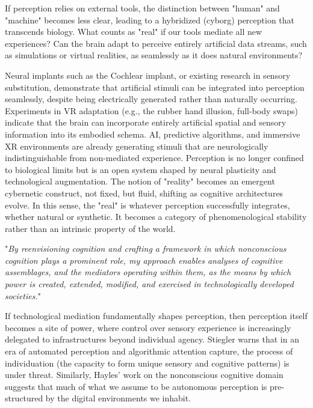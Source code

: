 If perception relies on external tools, the distinction between "human" and "machine" becomes less clear, leading to a hybridized (cyborg) perception that transcends biology. What counts as "real" if our tools mediate all new experiences? Can the brain adapt to perceive entirely artificial data streams, such as simulations or virtual realities, as seamlessly as it does natural environments?  

Neural implants such as the Cochlear implant, or existing research in sensory substitution, demonstrate that artificial stimuli can be integrated into perception seamlessly, despite being electrically generated rather than naturally occurring. Experiments in VR adaptation (e.g., the rubber hand illusion, full-body swaps) indicate that the brain can incorporate entirely artificial spatial and sensory information into its embodied schema. AI, predictive algorithms, and immersive XR environments are already generating stimuli that are neurologically indistinguishable from non-mediated experience. Perception is no longer confined to biological limits but is an open system shaped by neural plasticity and technological augmentation. The notion of "reality" becomes an emergent cybernetic construct, not fixed, but fluid, shifting as cognitive architectures evolve. In this sense, the "real" is whatever perception successfully integrates, whether natural or synthetic. It becomes a category of phenomenological stability rather than an intrinsic property of the world. 

"\textit{By reenvisioning cognition and crafting a framework in which nonconscious cognition plays a prominent role, my approach enables analyses of cognitive assemblages, and the mediators operating within them, as the means by which power is created, extended, modified, and exercised in technologically developed societies.}" \citep{hayles2017}

If technological mediation fundamentally shapes perception, then perception itself becomes a site of power, where control over sensory experience is increasingly delegated to infrastructures beyond individual agency. Stiegler warns that in an era of automated perception and algorithmic attention capture, the process of individuation (the capacity to form unique sensory and cognitive patterns) is under threat. Similarly, Hayles' work on the nonconscious cognitive domain suggests that much of what we assume to be autonomous perception is pre-structured by the digital environments we inhabit. 

